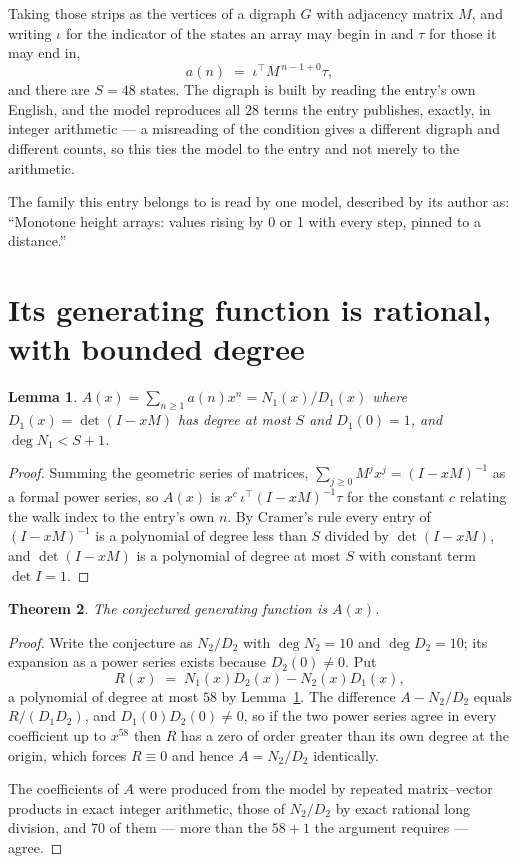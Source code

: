 \documentclass[11pt,a4paper]{article}
\theoremstyle{plain}
\newtheorem{theorem}{Theorem}
\newtheorem{lemma}[theorem]{Lemma}
\theoremstyle{definition}
\begin{document}
Taking those strips as the vertices of a digraph $G$ with adjacency matrix $M$, and writing
$\iota$ for the indicator of the states an array may begin in and $\tau$ for those it may end
in,
\[
a(n)\;=\;\iota^{\!\top}M^{\,n-1+0}\tau ,
\]
and there are $S=48$ states. The digraph is built by reading the entry's own English, and the
model reproduces all $28$ terms the entry publishes, exactly, in integer arithmetic --- a
misreading of the condition gives a different digraph and different counts, so this ties the
model to the entry and not merely to the arithmetic.

The family this entry belongs to is read by one model, described by its author as: ``Monotone height arrays: values rising by 0 or 1 with every step, pinned to a distance.''


\section{Its generating function is rational, with bounded degree}

\begin{lemma}\label{lem:rat}
$A(x)=\sum_{n\ge1}a(n)x^n=N_1(x)/D_1(x)$ where $D_1(x)=\det(I-xM)$ has degree at most
$S$ and $D_1(0)=1$, and $\deg N_1<S+1$.
\end{lemma}

\begin{proof}
Summing the geometric series of matrices, $\sum_{j\ge0}M^jx^j=(I-xM)^{-1}$ as a formal
power series, so $A(x)$ is $x^{c}\,\iota^{\!\top}(I-xM)^{-1}\tau$ for the constant $c$
relating the walk index to the entry's own $n$. By Cramer's rule every entry of
$(I-xM)^{-1}$ is a polynomial of degree less than $S$ divided by $\det(I-xM)$, and
$\det(I-xM)$ is a polynomial of degree at most $S$ with constant term $\det I=1$.
\end{proof}

\begin{theorem}
The conjectured generating function is $A(x)$.
\end{theorem}

\begin{proof}
Write the conjecture as $N_2/D_2$ with $\deg N_2=10$ and $\deg D_2=10$; its expansion as a
power series exists because $D_2(0)\neq0$. Put
\[
R(x)\;=\;N_1(x)D_2(x)-N_2(x)D_1(x),
\]
a polynomial of degree at most $58$ by Lemma~\ref{lem:rat}. The difference
$A-N_2/D_2$ equals $R/(D_1D_2)$, and $D_1(0)D_2(0)\neq0$, so if the two power series agree in
every coefficient up to $x^{58}$ then $R$ has a zero of order greater than its own
degree at the origin, which forces $R\equiv0$ and hence $A=N_2/D_2$ identically.

The coefficients of $A$ were produced from the model by repeated matrix--vector products in
exact integer arithmetic, those of $N_2/D_2$ by exact rational long division, and $70$
of them --- more than the $58+1$ the argument requires --- agree.
\end{proof}
\end{document}
